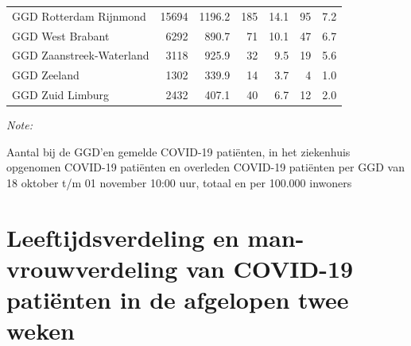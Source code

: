\documentclass[
  english,
  man,floatsintext]{apa6}
\begin{document}
\begin{table}[H]
\begin{threeparttable}
\begin{tabular}{lrrrrrr}
GGD Rotterdam Rijnmond & 15694 & 1196.2 & 185 & 14.1 & 95 & 7.2\\
GGD West Brabant & 6292 & 890.7 & 71 & 10.1 & 47 & 6.7\\
GGD Zaanstreek-Waterland & 3118 & 925.9 & 32 & 9.5 & 19 & 5.6\\
GGD Zeeland & 1302 & 339.9 & 14 & 3.7 & 4 & 1.0\\
GGD Zuid Limburg & 2432 & 407.1 & 40 & 6.7 & 12 & 2.0\\
\bottomrule
\end{tabular}
\begin{tablenotes}
\item \textit{Note: } 
\item Aantal bij de GGD’en gemelde COVID-19 patiënten, in het ziekenhuis opgenomen COVID-19 patiënten en overleden COVID-19 patiënten per GGD van 18 oktober t/m 01 november 10:00 uur, totaal en per 100.000 inwoners
\end{tablenotes}
\end{threeparttable}
\endgroup{}
\end{table}

\newpage

\hypertarget{leeftijdsverdeling-en-man-vrouwverdeling-van-covid-19-patiuxebnten-in-de-afgelopen-twee-weken}{%
\section{Leeftijdsverdeling en man-vrouwverdeling van COVID-19 patiënten in de afgelopen twee weken}\label{leeftijdsverdeling-en-man-vrouwverdeling-van-covid-19-patiuxebnten-in-de-afgelopen-twee-weken}}
\end{document}
